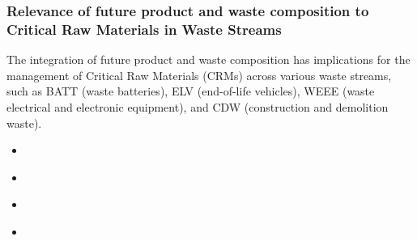 












\subsubsection{Relevance of future product and waste composition to Critical Raw Materials in Waste Streams}

The integration of future product and waste composition has implications for the management of Critical Raw Materials
(CRMs) across various waste streams, such as BATT (waste batteries), ELV
(end-of-life vehicles), WEEE (waste electrical and electronic equipment), and
CDW (construction and demolition waste).

\begin{itemize}
    \item 
\end{itemize}

\begin{itemize}
    \item 
\end{itemize}

\begin{itemize}
    \item 
\end{itemize}


\begin{itemize}
    \item
\end{itemize}

\sectionEndlines
\clearpage
